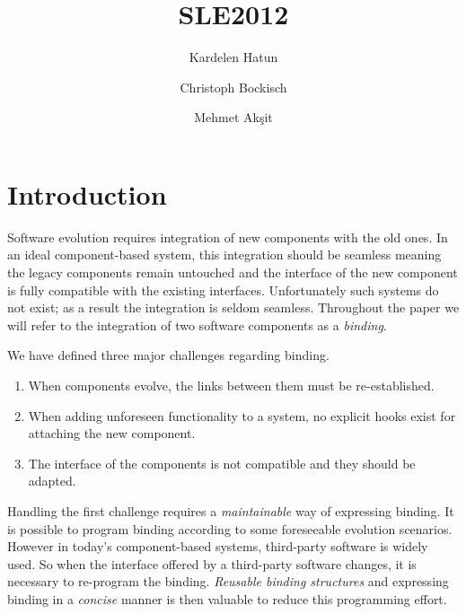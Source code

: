 \documentclass{llncs}
\begin{document}
\title{SLE2012}

\author{Kardelen Hatun \and Christoph Bockisch \and Mehmet Ak\c{s}it}

\maketitle
\section{Introduction}
Software evolution requires integration of new components with the old ones. In an
ideal component-based system, this integration should be seamless meaning 
 the legacy components remain untouched and the interface of the new component is fully compatible with the existing interfaces. 
Unfortunately such systems do not exist; as a result the integration is seldom
seamless. Throughout the paper we will refer to the integration of two software components as a
\emph{binding}. 



We have defined three major challenges regarding binding. 
\begin{enumerate}
  	\item When components evolve, the links between them
	must be re-established. 
 	 \item When adding unforeseen functionality to a system, no explicit hooks
 	 exist for attaching the new component. 
	\item The interface of the components is not compatible and they should be adapted.
\end{enumerate}

Handling the first challenge requires a \emph{maintainable} way of expressing binding. It is possible to program binding according to some foreseeable evolution scenarios. However in today's component-based systems, third-party software is widely used. So when the interface offered by a third-party software changes, it is necessary to re-program the binding. \emph{Reusable binding structures} and expressing binding in a \emph{concise} manner is then valuable to reduce this programming effort.
\end{document}
